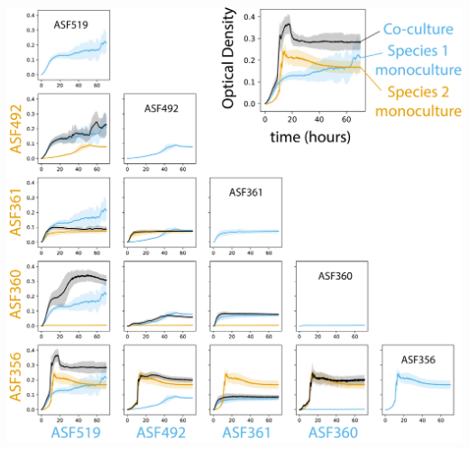 \documentclass[11pt,twocolumn,notitlepage,openany,twoside]{book}
\begin{document}
\begin{refsection}
\begin{suppfigure*}
\centering
\includegraphics[width=\textwidth]{ch2_figS2}
\caption[Optical density-based growth curves for \textit{Clostridium} ASF356, \textit{Lactobacillus} ASF360, \textit{Lactobacillus} ASF361, \textit{Eubacterium} ASF492, and \textit{Parabacteroides} ASF519.]{\textbf{Optical density-based growth curves for \textit{Clostridium} ASF356, \textit{Lactobacillus} ASF360, \textit{Lactobacillus} ASF361, \textit{Eubacterium} ASF492, and \textit{Parabacteroides} ASF519.} Optical density was measured at 589nm. Experiments were performed in 96 well plates with 200{\textmu}L total volume in each well. Each sample group (monocultures and co-cultures) contains 8 biological replicates from a single experiment (e.g. each replicate was grown in an independent well, but they were derived from the same starter culture). Line shows the mean for each sample group, and shading extends one standard deviation from the mean in both the positive and negative direction. Sky blue line indicates monoculture for the strain labelled in sky blue along the x axis. Orange line indicates monoculture for the strain labelled in orange along the y axis. Black line indicates co-culture of the two strains. Diagonal shows the monoculture growth curve for each species. Axes units are identical on all subplots. Time is shown in hours, extending to 72 hours.}
\end{suppfigure*}

\end{refsection}
\end{document}
